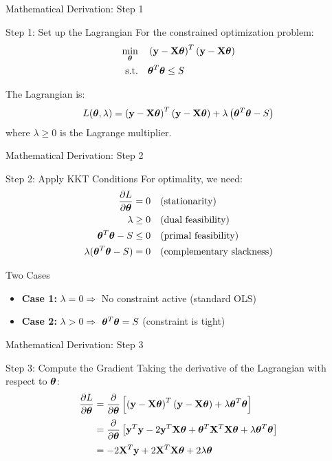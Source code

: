 \documentclass{beamer}
\begin{document}
\begin{frame}{Mathematical Derivation: Step 1}
\begin{codebox}{Step 1: Set up the Lagrangian}
{\small For the constrained optimization problem:}
\begin{align*}
\min_{\boldsymbol{\theta}} & \quad \left(\mathbf{y}-\mathbf{X}\boldsymbol{\theta}\right)^T\left(\mathbf{y}-\mathbf{X}\boldsymbol{\theta}\right) \\
\text{s.t.} & \quad \boldsymbol{\theta}^T\boldsymbol{\theta} \leq S
\end{align*}

{\small The Lagrangian is:}
$$L(\boldsymbol{\theta}, \lambda) = \left(\mathbf{y}-\mathbf{X}\boldsymbol{\theta}\right)^T\left(\mathbf{y}-\mathbf{X}\boldsymbol{\theta}\right) + \lambda\left(\boldsymbol{\theta}^T\boldsymbol{\theta} - S\right)$$
{\small where $\lambda \geq 0$ is the Lagrange multiplier.}
\end{codebox}
\end{frame}

\begin{frame}{Mathematical Derivation: Step 2}
\begin{codebox}{Step 2: Apply KKT Conditions}
For optimality, we need:
\begin{align}
\frac{\partial L}{\partial \boldsymbol{\theta}} &= 0 \quad \text{(stationarity)} \\
\lambda &\geq 0 \quad \text{(dual feasibility)} \\
\boldsymbol{\theta}^T\boldsymbol{\theta} - S &\leq 0 \quad \text{(primal feasibility)} \\
\lambda(\boldsymbol{\theta}^T\boldsymbol{\theta} - S) &= 0 \quad \text{(complementary slackness)}
\end{align}
\end{codebox}
\pause

\begin{keypointsbox}{Two Cases}
\begin{itemize}
\item \textbf{Case 1:} $\lambda = 0 \Rightarrow$ No constraint active (standard OLS)
\item \textbf{Case 2:} $\lambda > 0 \Rightarrow$ $\boldsymbol{\theta}^T\boldsymbol{\theta} = S$ (constraint is tight)
\end{itemize}
\end{keypointsbox}
\end{frame}

\begin{frame}{Mathematical Derivation: Step 3}
\begin{codebox}{Step 3: Compute the Gradient}
Taking the derivative of the Lagrangian with respect to $\boldsymbol{\theta}$:
{\small
\begin{align}
\frac{\partial L}{\partial \boldsymbol{\theta}} &= \frac{\partial}{\partial \boldsymbol{\theta}}\left[\left(\mathbf{y}-\mathbf{X}\boldsymbol{\theta}\right)^T\left(\mathbf{y}-\mathbf{X}\boldsymbol{\theta}\right) + \lambda \boldsymbol{\theta}^T\boldsymbol{\theta}\right] \\[0.2em]
&= \frac{\partial}{\partial \boldsymbol{\theta}}\left[\mathbf{y}^T\mathbf{y} - 2\mathbf{y}^T\mathbf{X}\boldsymbol{\theta} + \boldsymbol{\theta}^T\mathbf{X}^T\mathbf{X}\boldsymbol{\theta} + \lambda \boldsymbol{\theta}^T\boldsymbol{\theta}\right] \\[0.2em]
&= -2\mathbf{X}^T\mathbf{y} + 2\mathbf{X}^T\mathbf{X}\boldsymbol{\theta} + 2\lambda\boldsymbol{\theta}
\end{align}
}
\end{codebox}
\end{frame}
\end{document}
